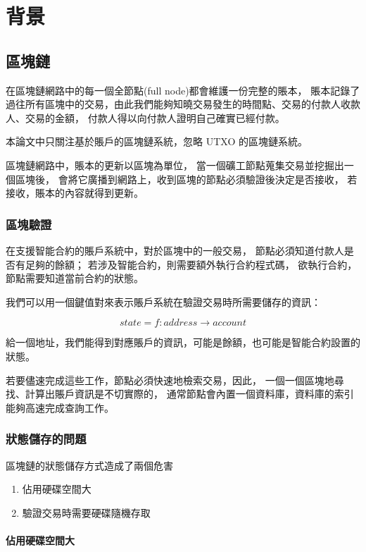 \graphicspath{ {./images/} }
\chapter{背景}
\label{c:background}

\section{區塊鏈}

在區塊鏈網路中的每一個全節點(full node)都會維護一份完整的賬本，
賬本記錄了過往所有區塊中的交易，由此我們能夠知曉交易發生的時間點、交易的付款人收款人、交易的金額，
付款人得以向付款人證明自己確實已經付款。

本論文中只關注基於賬戶的區塊鏈系統，忽略 UTXO 的區塊鏈系統。

區塊鏈網路中，賬本的更新以區塊為單位，
當一個礦工節點蒐集交易並挖掘出一個區塊後，
會將它廣播到網路上，收到區塊的節點必須驗證後決定是否接收，
若接收，賬本的內容就得到更新。

\subsection{區塊驗證}

在支援智能合約的賬戶系統中，對於區塊中的一般交易，
節點必須知道付款人是否有足夠的餘額；
若涉及智能合約，則需要額外執行合約程式碼，
欲執行合約，節點需要知道當前合約的狀態。

我們可以用一個鍵值對來表示賬戶系統在驗證交易時所需要儲存的資訊：

\[state = f: address\to account \]

給一個地址，我們能得到對應賬戶的資訊，可能是餘額，也可能是智能合約設置的狀態。

若要儘速完成這些工作，節點必須快速地檢索交易，因此，
一個一個區塊地尋找、計算出賬戶資訊是不切實際的， 
通常節點會內置一個資料庫，資料庫的索引能夠高速完成查詢工作。

\subsection{狀態儲存的問題}

區塊鏈的狀態儲存方式造成了兩個危害

\begin{enumerate}
  \item 佔用硬碟空間大
  \item 驗證交易時需要硬碟隨機存取
\end{enumerate}

\subsubsection{佔用硬碟空間大}

